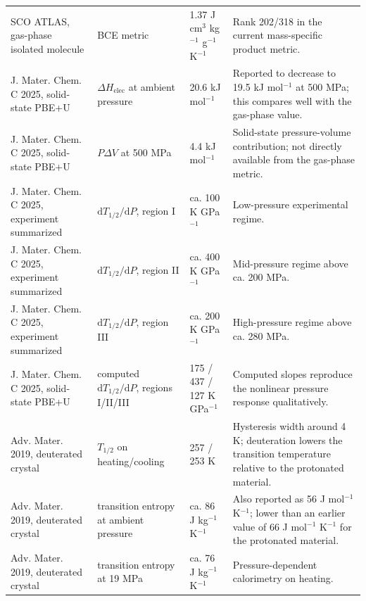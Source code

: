 \begin{longtable}{p{} p{} p{} p{}}
SCO ATLAS, gas-phase isolated molecule
& BCE metric
& 1.37 J cm$^{3}$ kg$^{-1}$ g$^{-1}$ K$^{-1}$
& Rank 202/318 in the current mass-specific product metric. \\

J. Mater. Chem. C 2025, solid-state PBE+U
& $\Delta H_{\mathrm{elec}}$ at ambient pressure
& 20.6 kJ mol$^{-1}$
& Reported to decrease to 19.5 kJ mol$^{-1}$ at 500 MPa; this compares well with the gas-phase value. \\

J. Mater. Chem. C 2025, solid-state PBE+U
& $P\Delta V$ at 500 MPa
& 4.4 kJ mol$^{-1}$
& Solid-state pressure-volume contribution; not directly available from the gas-phase metric. \\

J. Mater. Chem. C 2025, experiment summarized
& $\mathrm{d}T_{1/2}/\mathrm{d}P$, region I
& ca. 100 K GPa$^{-1}$
& Low-pressure experimental regime. \\

J. Mater. Chem. C 2025, experiment summarized
& $\mathrm{d}T_{1/2}/\mathrm{d}P$, region II
& ca. 400 K GPa$^{-1}$
& Mid-pressure regime above ca. 200 MPa. \\

J. Mater. Chem. C 2025, experiment summarized
& $\mathrm{d}T_{1/2}/\mathrm{d}P$, region III
& ca. 200 K GPa$^{-1}$
& High-pressure regime above ca. 280 MPa. \\

J. Mater. Chem. C 2025, solid-state PBE+U
& computed $\mathrm{d}T_{1/2}/\mathrm{d}P$, regions I/II/III
& 175 / 437 / 127 K GPa$^{-1}$
& Computed slopes reproduce the nonlinear pressure response qualitatively. \\

Adv. Mater. 2019, deuterated crystal
& $T_{1/2}$ on heating/cooling
& 257 / 253 K
& Hysteresis width around 4 K; deuteration lowers the transition temperature relative to the protonated material. \\

Adv. Mater. 2019, deuterated crystal
& transition entropy at ambient pressure
& ca. 86 J kg$^{-1}$ K$^{-1}$
& Also reported as 56 J mol$^{-1}$ K$^{-1}$; lower than an earlier value of 66 J mol$^{-1}$ K$^{-1}$ for the protonated material. \\

Adv. Mater. 2019, deuterated crystal
& transition entropy at 19 MPa
& ca. 76 J kg$^{-1}$ K$^{-1}$
& Pressure-dependent calorimetry on heating. \\


\end{longtable}
